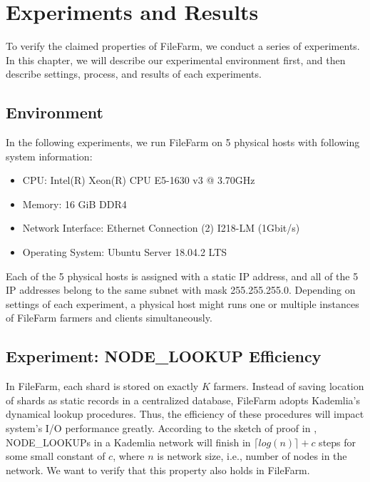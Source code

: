 \chapter{Experiments and Results}
\label{c:experiments_and_results}

To verify the claimed properties of FileFarm, we conduct a series of experiments. In this chapter, we will describe our experimental environment first, and then describe settings, process, and results of each experiments.

\section{Environment}
\label{s:expenvironment}

In the following experiments, we run FileFarm on 5 physical hosts with following system information:

\begin{itemize}
    \item CPU: Intel(R) Xeon(R) CPU E5-1630 v3 @ 3.70GHz
    \item Memory: 16 GiB DDR4
    \item Network Interface: Ethernet Connection (2) I218-LM (1Gbit/s)
    \item Operating System: Ubuntu Server 18.04.2 LTS
\end{itemize}

 \noindent Each of the 5 physical hosts is assigned with a static IP address, and all of the 5 IP addresses belong to the same subnet with mask 255.255.255.0. Depending on settings of each experiment, a physical host might runs one or multiple instances of FileFarm farmers and clients simultaneously.

\newpage

\section{Experiment: NODE\_LOOKUP Efficiency}
\label{s:expnodelookupefficiency}

In FileFarm, each shard is stored on exactly $K$ farmers. Instead of saving location of shards as static records in a centralized database, FileFarm adopts Kademlia's dynamical lookup procedures. Thus, the efficiency of these procedures will impact system's I/O performance greatly. According to the sketch of proof in \cite{maymounkov2002kademlia}, NODE\_LOOKUPs in a Kademlia network will finish in $\lceil log(n) \rceil + c$ steps for some small constant of $c$, where $n$ is network size, i.e., number of nodes in the network. We want to verify that this property also holds in FileFarm.

